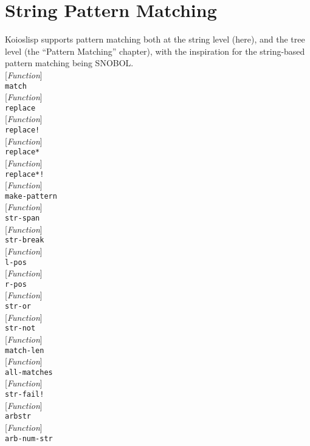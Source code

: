 \documentclass[10pt]{book}
\newenvironment{defother}[2]{[\textit{#1}]\\\texttt{#2}}{\\}
\newenvironment{defun}[1]{\begin{defother}{Function}{#1}}{\end{defother}}
\begin{document}
\section{String Pattern Matching}
Koioslisp supports pattern matching both at the string level (here), and the tree level (the ``Pattern Matching'' chapter), with the inspiration for the string-based pattern matching being SNOBOL.\\
\begin{defun}{match}\end{defun} %
\begin{defun}{replace}\end{defun}%
\begin{defun}{replace!}\end{defun}
\begin{defun}{replace*}\end{defun}
\begin{defun}{replace*!}\end{defun}
\begin{defun}{make-pattern}\end{defun} %
\begin{defun}{str-span}\end{defun}
\begin{defun}{str-break}\end{defun}
\begin{defun}{l-pos}\end{defun}
\begin{defun}{r-pos}\end{defun}
\begin{defun}{str-or}\end{defun}
\begin{defun}{str-not}\end{defun}
\begin{defun}{match-len}\end{defun}
\begin{defun}{all-matches}\end{defun} %
\begin{defun}{str-fail!}\end{defun}
\begin{defun}{arbstr}\end{defun}
\begin{defun}{arb-num-str}\end{defun}
\end{document}

